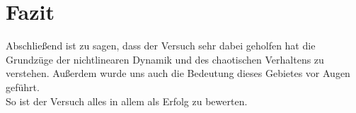 

\chapter{Fazit}
\label{chap:fazit}

Abschließend ist zu sagen, dass der Versuch sehr dabei geholfen hat die Grundzüge der nichtlinearen Dynamik und des chaotischen Verhaltens zu verstehen. Außerdem wurde uns auch die Bedeutung dieses Gebietes vor Augen geführt. \\
So ist der Versuch alles in allem als Erfolg zu bewerten.